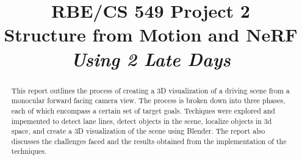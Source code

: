 \documentclass[conference]{IEEEtran}
\begin{document}
\title{
  RBE/CS 549 Project 2\\
   Structure from Motion and NeRF \\
  \vspace{0.3cm}
  \large{\textit{Using 2 Late Days}}
}

\author{
 \and
{}
}

\maketitle

\begin{abstract}
This report outlines the process of creating a 3D visualization of a driving scene from a monocular forward facing camera view. The process is broken down into three phases, each of which encompass a certain set of target goals. Techiques were explored and impemented to detect lane lines, detect objects in the scene, localize objects in 3d space, and create a 3D visualization of the scene using Blender. The report also discusses the challenges faced and the results obtained from the implementation of the techniques.
\end{abstract}









\printbibliography

\
\end{document}
